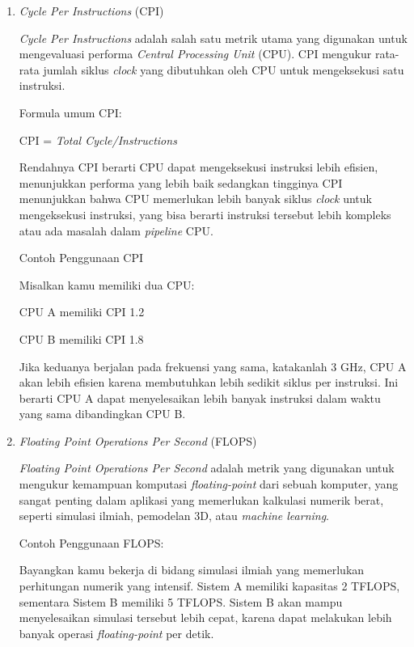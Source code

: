\documentclass[12pt]{article}
\begin{document}
\begin{enumerate}
    \item \textit{Cycle Per Instructions} (CPI) 
    \par \textit{Cycle Per Instructions} adalah salah satu metrik utama yang digunakan untuk mengevaluasi performa \textit{Central Processing Unit} (CPU). CPI mengukur rata-rata jumlah siklus \textit{clock} yang dibutuhkan oleh CPU untuk mengeksekusi satu instruksi.
    \par Formula umum CPI: 
    \par CPI = \textit{Total Cycle/Instructions}
    \par Rendahnya CPI berarti CPU dapat mengeksekusi instruksi lebih efisien, menunjukkan performa yang lebih baik sedangkan tingginya CPI menunjukkan bahwa CPU memerlukan lebih banyak siklus \textit{clock} untuk mengeksekusi instruksi, yang bisa berarti instruksi tersebut lebih kompleks atau ada masalah dalam \textit{pipeline} CPU.
    \par Contoh Penggunaan CPI
    \par Misalkan kamu memiliki dua CPU: 
    \par CPU A memiliki CPI 1.2 
    \par CPU B memiliki CPI 1.8 
    \par Jika keduanya berjalan pada frekuensi yang sama, katakanlah 3 GHz, CPU A akan lebih efisien karena membutuhkan lebih sedikit siklus per instruksi. Ini berarti CPU A dapat menyelesaikan lebih banyak instruksi dalam waktu yang sama dibandingkan CPU B.

    \item \textit{Floating Point Operations Per Second} (FLOPS)
    \par \textit{Floating Point Operations Per Second} adalah metrik yang digunakan untuk mengukur
    kemampuan komputasi \textit{floating-point} dari sebuah
    komputer, yang sangat penting dalam aplikasi yang
    memerlukan kalkulasi numerik berat, seperti simulasi
    ilmiah, pemodelan 3D, atau \textit{machine learning}.
    \par Contoh Penggunaan FLOPS:
    \par Bayangkan kamu bekerja di bidang simulasi ilmiah yang memerlukan perhitungan numerik yang intensif. Sistem A memiliki kapasitas 2 TFLOPS, sementara Sistem B memiliki 5 TFLOPS. Sistem B akan mampu menyelesaikan simulasi tersebut lebih cepat, karena dapat melakukan lebih banyak operasi \textit{floating-point} per detik.


\end{enumerate}
\end{document}
